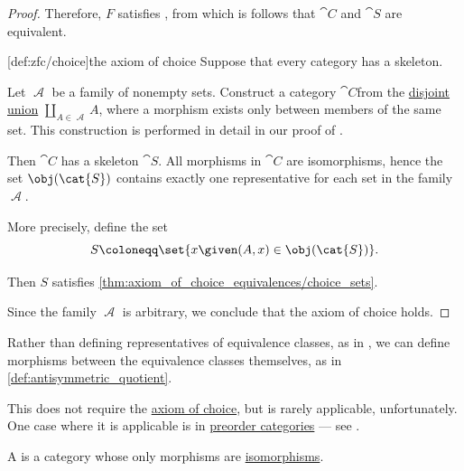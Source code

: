 \begin{proof}
  Therefore, \( F \) satisfies , from which is follows that \( \cat{C} \) and \( \cat{S} \) are equivalent.

  [def:zfc/choice]{the axiom of choice} Suppose that every category has a skeleton.

  Let \( \mscrA \) be a family of nonempty sets. Construct a category \( \cat{C} \)from the \hyperref[def:disjoint_union]{disjoint union} \( \coprod_{A \in \mscrA} A \), where a morphism exists only between members of the same set. This construction is performed in detail in our proof of .

  Then \( \cat{C} \) has a skeleton \( \cat{S} \). All morphisms in \( \cat{C} \) are isomorphisms, hence the set \( \obj(\cat{S}) \) contains exactly one representative for each set in the family \( \mscrA \).

  More precisely, define the set
  \begin{equation*}
    S \coloneqq \set{ x \given (A, x) \in \obj(\cat{S}) }.
  \end{equation*}

  Then \( S \) satisfies \cref{thm:axiom_of_choice_equivalences/choice_sets}.

  Since the family \( \mscrA \) is arbitrary, we conclude that the axiom of choice holds.
\end{proof}

\begin{remark}\label{rem:skeletons_and_preorder_categories}
  Rather than defining representatives of equivalence classes, as in , we can define morphisms between the equivalence classes themselves, as in \cref{def:antisymmetric_quotient}.

  This does not require the \hyperref[def:zfc/choice]{axiom of choice}, but is rarely applicable, unfortunately. One case where it is applicable is in \hyperref[def:preorder_category]{preorder categories} --- see .
\end{remark}

\begin{definition}\label{def:groupoid}
  A  is a category whose only morphisms are \hyperref[def:morphism_invertibility/isomorphism]{isomorphisms}.
\end{definition}

